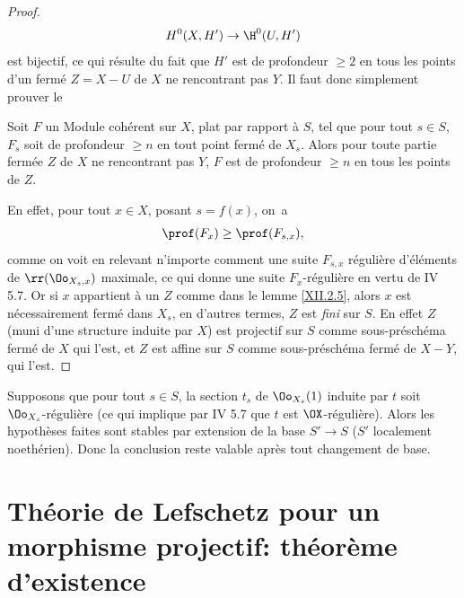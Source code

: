 \begin{proof}
\[
H^0(X, H')\to\H^0(U, H')
\]
est bijectif, ce qui r\'esulte du fait que $H'$ est de profondeur $\geq 2$ en tous les points d'un ferm\'e $Z=X- U$ de $X$ ne rencontrant pas $Y$. Il faut donc simplement prouver le

\begin{lemme} \label{XII.2.5} Soit $F$ un Module coh\'erent sur $X$, plat par rapport \`a $S$, tel que pour tout $s\in S$, $F_s$ soit de profondeur $\geq n$ en tout point ferm\'e de $X_s$. Alors pour toute partie ferm\'ee $Z$ de $X$ ne rencontrant pas $Y$, $F$ est de profondeur $\geq n$ en tous les points de $Z$.
\end{lemme}

En effet, pour tout $x\in X$, posant $s=f(x)$, on~a
\steco
\begin{equation} \label{eq:XII.16} {}\prof(F_x)\geq \prof(F_{s, x}),
\end{equation}
comme on voit en relevant n'importe comment une suite $F_{s, x}$ r\'eguli\`ere d'\'el\'ements de $\rr(\Oo_{X_s, x})$ maximale, ce qui donne une suite $F_x$-r\'eguli\`ere en vertu de  IV 5.7. Or si $x$ appartient \`a un $Z$ comme dans le lemme \ref{XII.2.5}, alors $x$ est n\'ecessairement ferm\'e dans $X_s$, en d'autres termes, $Z$ est \emph{fini} sur $S$. En effet $Z$ (muni d'une structure induite par $X$) est projectif sur $S$ comme sous-pr\'esch\'ema ferm\'e de $X$ qui l'est, et $Z$ est affine sur $S$ comme sous-pr\'esch\'ema ferm\'e de $X- Y$, qui l'est.
\skipqed
\end{proof}

\begin{remarque} \label{XII.2.6}
Supposons que pour tout $s\in S$, la section $t_s$ de $\Oo_{X_s}(1)$ induite par $t$ soit $\Oo_{X_s}$-r\'eguli\`ere (ce qui implique par  IV 5.7 que $t$ est $\OX$-r\'eguli\`ere). Alors les hypoth\`eses faites sont stables par extension de la base $S'\to S$ ($S'$ localement noeth\'erien). Donc la conclusion reste valable apr\`es tout changement de base.
\end{remarque}

\section[Th\'eorie de Lefschetz pour un morphisme projectif: existence]{Th\'eorie de Lefschetz pour un morphisme projectif: th\'eor\`eme d'existence}\label{XII.3}%

